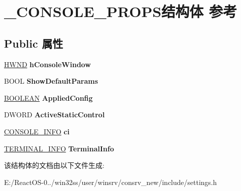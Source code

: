\hypertarget{struct___c_o_n_s_o_l_e___p_r_o_p_s}{}\section{\+\_\+\+C\+O\+N\+S\+O\+L\+E\+\_\+\+P\+R\+O\+P\+S结构体 参考}
\label{struct___c_o_n_s_o_l_e___p_r_o_p_s}
\subsection*{Public 属性}
\begin{DoxyCompactItemize}
\item 
\mbox{\label{struct___c_o_n_s_o_l_e___p_r_o_p_s_ab704dabb06b9e4e47a133dcc906d8b03}} 
\hyperlink{interfacevoid}{H\+W\+ND} {\bfseries h\+Console\+Window}
\item 
\mbox{\label{struct___c_o_n_s_o_l_e___p_r_o_p_s_a2aa8ae58e275eda1560debed34d47213}} 
B\+O\+OL {\bfseries Show\+Default\+Params}
\item 
\mbox{\label{struct___c_o_n_s_o_l_e___p_r_o_p_s_a6df26d2d9914340342697371aff95555}} 
\hyperlink{_processor_bind_8h_a112e3146cb38b6ee95e64d85842e380a}{B\+O\+O\+L\+E\+AN} {\bfseries Applied\+Config}
\item 
\mbox{\label{struct___c_o_n_s_o_l_e___p_r_o_p_s_a4bb62be220eb13b564d92601c89b332e}} 
D\+W\+O\+RD {\bfseries Active\+Static\+Control}
\item 
\mbox{\label{struct___c_o_n_s_o_l_e___p_r_o_p_s_aa9331171c84d36f38435de7dbaa533f1}} 
\hyperlink{struct___c_o_n_s_o_l_e___i_n_f_o}{C\+O\+N\+S\+O\+L\+E\+\_\+\+I\+N\+FO} {\bfseries ci}
\item 
\mbox{\label{struct___c_o_n_s_o_l_e___p_r_o_p_s_ae04355c38cc382e1c851a9df097d85b0}} 
\hyperlink{struct___t_e_r_m_i_n_a_l___i_n_f_o}{T\+E\+R\+M\+I\+N\+A\+L\+\_\+\+I\+N\+FO} {\bfseries Terminal\+Info}
\end{DoxyCompactItemize}


该结构体的文档由以下文件生成\+:\begin{DoxyCompactItemize}
\item 
E\+:/\+React\+O\+S-\/0../win32ss/user/winsrv/consrv\+\_\+new/include/settings.\+h\end{DoxyCompactItemize}
